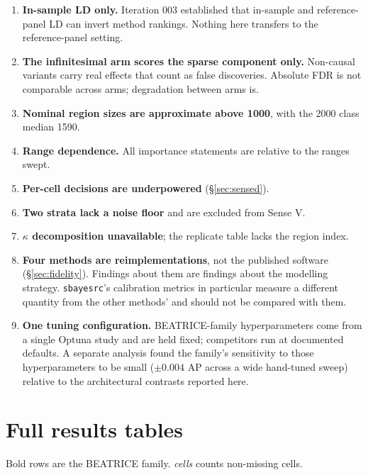 \documentclass[11pt,a4paper]{article}
\begin{document}
\begin{enumerate}
\item \textbf{In-sample LD only.} Iteration 003 established that in-sample and
reference-panel LD can invert method rankings. Nothing here transfers to the
reference-panel setting.
\item \textbf{The infinitesimal arm scores the sparse component only.} Non-causal
variants carry real effects that count as false discoveries. Absolute FDR is not
comparable across arms; degradation between arms is.
\item \textbf{Nominal region sizes are approximate above 1000}, with the 2000
class median 1590.
\item \textbf{Range dependence.} All importance statements are relative to the
ranges swept.
\item \textbf{Per-cell decisions are underpowered} (\S\ref{sec:sensed}).
\item \textbf{Two strata lack a noise floor} and are excluded from Sense V.
\item \textbf{$\kappa$ decomposition unavailable}; the replicate table lacks the
region index.
\item \textbf{Four methods are reimplementations}, not the published software
(\S\ref{sec:fidelity}). Findings about them are findings about the modelling
strategy. \texttt{sbayesrc}'s calibration metrics in particular measure a
different quantity from the other methods' and should not be compared with them.
\item \textbf{One tuning configuration.} BEATRICE-family hyperparameters come
from a single Optuna study and are held fixed; competitors run at documented
defaults. A separate analysis found the family's sensitivity to those
hyperparameters to be small ($\pm0.004$ AP across a wide hand-tuned sweep)
relative to the architectural contrasts reported here.
\end{enumerate}

\section{Full results tables}\label{sec:tables}

Bold rows are the BEATRICE family. \emph{cells} counts non-missing cells.


\end{document}
